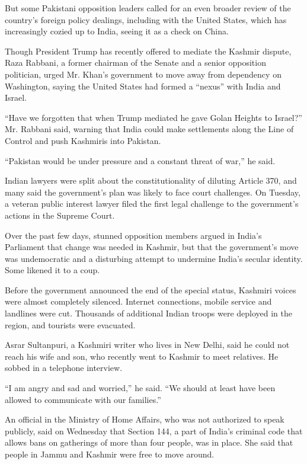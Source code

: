 But some Pakistani opposition leaders called for an even broader review
of the country's foreign policy dealings, including with the United
States, which has increasingly cozied up to India, seeing it as a check
on China.

Though President Trump has recently offered to mediate the Kashmir
dispute, Raza Rabbani, a former chairman of the Senate and a senior
opposition politician, urged Mr. Khan's government to move away from
dependency on Washington, saying the United States had formed a
``nexus'' with India and Israel.

``Have we forgotten that when Trump mediated he gave Golan Heights to
Israel?'' Mr. Rabbani said, warning that India could make settlements
along the Line of Control and push Kashmiris into Pakistan.

``Pakistan would be under pressure and a constant threat of war,'' he
said.

Indian lawyers were split about the constitutionality of diluting
Article 370, and many said the government's plan was likely to face
court challenges. On Tuesday, a veteran public interest lawyer filed the
first legal challenge to the government's actions in the Supreme Court.

Over the past few days, stunned opposition members argued in India's
Parliament that change was needed in Kashmir, but that the government's
move was undemocratic and a disturbing attempt to undermine India's
secular identity. Some likened it to a coup.

Before the government announced the end of the special status, Kashmiri
voices were almost completely silenced. Internet connections, mobile
service and landlines were cut. Thousands of additional Indian troops
were deployed in the region, and tourists were evacuated.

Asrar Sultanpuri, a Kashmiri writer who lives in New Delhi, said he
could not reach his wife and son, who recently went to Kashmir to meet
relatives. He sobbed in a telephone interview.

``I am angry and sad and worried,'' he said. ``We should at least have
been allowed to communicate with our families.''

An official in the Ministry of Home Affairs, who was not authorized to
speak publicly, said on Wednesday that Section 144, a part of India's
criminal code that allows bans on gatherings of more than four people,
was in place. She said that people in Jammu and Kashmir were free to
move around.

